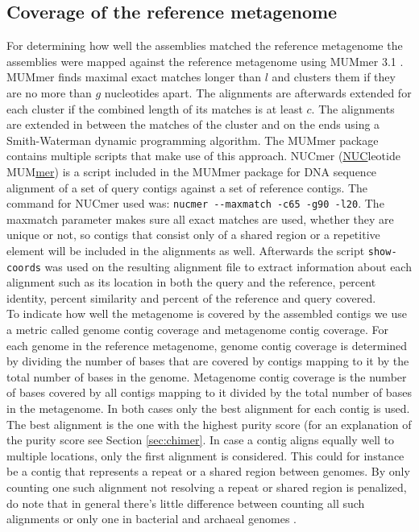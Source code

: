 \documentclass[a4paper,12pt]{report}
\begin{document}
\subsection{Coverage of the reference metagenome}
\label{sec:cov}
For determining how
well the assemblies matched the reference metagenome the assemblies were mapped
against the reference metagenome using MUMmer 3.1 \cite{Kurtz14759262}.  MUMmer
finds maximal exact matches longer than $l$ and clusters them if they are no
more than $g$ nucleotides apart. The alignments are afterwards extended for
each cluster if the combined length of its matches is at least $c$. The
alignments are extended in between the matches of the cluster and on the ends
using a Smith-Waterman dynamic programming algorithm. The MUMmer package
contains multiple scripts that make use of this approach. NUCmer
(\underline{NUC}leotide MUM\underline{mer}) is a script included in the MUMmer
package for DNA sequence alignment of a set of query contigs against a set of
reference contigs. The command for NUCmer used was: 
\verb!nucmer --maxmatch -c65 -g90 -l20!. The maxmatch parameter makes sure all
exact matches are used, whether they are unique or not, so contigs that consist
only of a shared region or a repetitive element will be included in the
alignments as well. Afterwards the script \verb!show-coords! was used on the
resulting alignment file to extract information about each alignment such as
its location in both the query and the reference, percent identity, percent
similarity and percent of the reference and query covered.\\


To indicate how well the metagenome is covered by the assembled contigs we use
a metric called genome contig coverage and metagenome contig coverage. For each
genome in the reference metagenome, genome contig coverage is determined by
dividing the number of bases that are covered by contigs mapping to it by the
total number of bases in the genome. Metagenome contig coverage is the number
of bases covered by all contigs mapping to it divided by the total number of
bases in the metagenome. In both cases only the best alignment for each contig
is used. The best alignment is the one with the highest purity score (for an
explanation of the purity score see Section \ref{sec:chimer}. In case a contig
aligns equally well to multiple locations, only the first alignment is
considered. This could for instance be a contig that represents a repeat or a
shared region between genomes. By only counting one such alignment not
resolving a repeat or shared region is penalized, do note that in general
there's little difference between counting all such alignments or only one in
bacterial and archaeal genomes \cite{repeat shared region size}.
\end{document}
